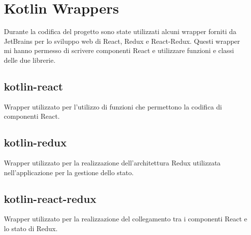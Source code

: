 \section{Kotlin Wrappers}
Durante la codifica del progetto sono state utilizzati alcuni wrapper forniti da JetBrains per lo sviluppo web di React, Redux e React-Redux. Questi wrapper mi hanno permesso di scrivere componenti React e utilizzare funzioni e classi delle due librerie.

\subsection{kotlin-react}
Wrapper utilizzato per l'utilizzo di funzioni che permettono la codifica di componenti React.

\subsection{kotlin-redux}
Wrapper utilizzato per la realizzazione dell'architettura Redux utilizzata nell'applicazione per la gestione dello stato.

\subsection{kotlin-react-redux}
Wrapper utilizzato per la realizzazione del collegamento tra i componenti React e lo stato di Redux.










